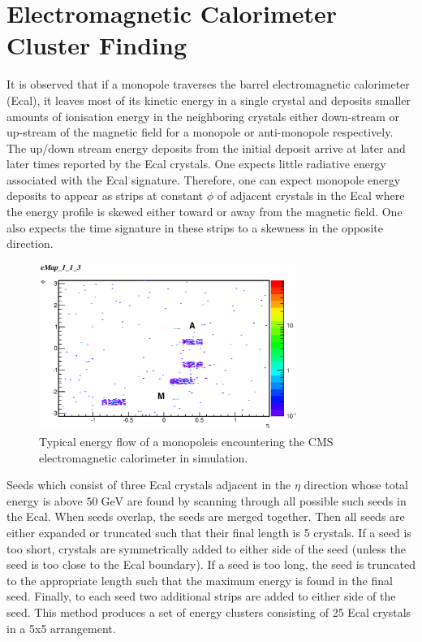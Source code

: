 


\section{Electromagnetic Calorimeter Cluster Finding}
It is observed that if a monopole traverses the barrel electromagnetic calorimeter (Ecal),
it leaves most of its kinetic energy in a single crystal and deposits smaller amounts
of ionisation energy in the neighboring crystals either down-stream or up-stream of the 
magnetic field for a monopole or anti-monopole respectively.  The up/down stream energy
deposits from the initial deposit arrive at later and later times reported by the Ecal 
crystals.  One expects little radiative energy associated with the Ecal signature.
Therefore, one can expect monopole energy deposits to appear as strips at constant $\phi$
of adjacent crystals in the Ecal where the energy profile is skewed either toward or 
away from the magnetic field.  One also expects the time signature in these strips to a 
skewness in the opposite direction.   

\begin{figure}[H]
\centering
\includegraphics[width=0.75\textwidth]{plots/HiggsEcalMap_3.eps}
\caption{Typical energy flow of a monopoleis encountering the CMS electromagnetic
calorimeter in simulation.}
\label{fig:SimEcalMap}
\end{figure}

Seeds which consist of three Ecal crystals adjacent in the $\eta$ direction whose total
energy is above $50\;\mbox{GeV}$ are found by scanning through all possible such seeds in 
the Ecal.  When seeds overlap, the seeds are merged together.  Then all seeds are either
expanded or truncated such that their final length is 5 crystals.  If a seed is too short,
crystals are symmetrically added to either side of the seed (unless the seed is too close 
to the Ecal boundary).  If a seed is too long, the seed is truncated to the appropriate
length such that the maximum energy is found in the final seed. Finally, to each
seed two additional strips are added to either side of the seed.  This method produces a 
set of energy clusters consisting of 25 Ecal crystals in a 5x5 arrangement.


